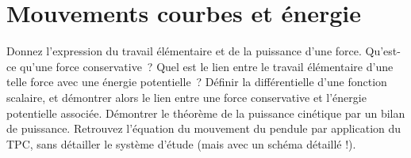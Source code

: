 \documentclass[a4paper, 10pt, final, garamond]{book}
\begin{document}
\setcounter{chapter}{15}

\chapter{Mouvements courbes et énergie}

\begin{enumerate}[label=\sqenumi]
	Donnez l'expression du travail élémentaire et de la puissance d'une force.
	Qu'est-ce qu'une force conservative~? Quel est le lien entre le travail
	élémentaire d'une telle force avec une énergie potentielle~? Définir la
	différentielle d'une fonction scalaire, et démontrer alors le lien entre une
	force conservative et l'énergie potentielle associée.
	\smallbreak
	\vspace{-15pt}
	Démontrer le théorème de la puissance cinétique par un bilan de puissance.
	Retrouvez l'équation du mouvement du pendule par application du TPC, sans
	détailler le système d'étude (mais avec un schéma détaillé !).
	\smallbreak
	\begin{isd}[sidebyside align=top, lefthand ratio=.3]
		\vspace*{-15pt}
		\tcblower
		\begin{minipage}{0.25\linewidth}
			\begin{center}

\end{center}
\end{minipage}
\end{isd}
\end{enumerate}
\end{document}
